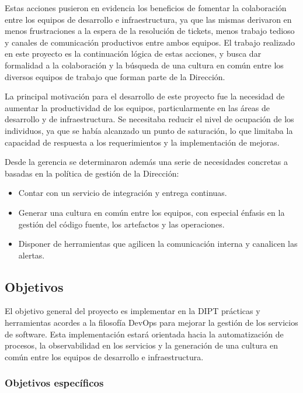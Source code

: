 Estas acciones pusieron en evidencia los beneficios de fomentar la colaboración entre los equipos de desarrollo e infraestructura, ya que las mismas derivaron en menos frustraciones a la espera de la resolución de tickets, menos trabajo tedioso y canales de comunicación productivos entre ambos equipos. El trabajo realizado en este proyecto es la continuación lógica de estas acciones, y busca dar formalidad a la colaboración y la búsqueda de una cultura en común entre los diversos equipos de trabajo que forman parte de la Dirección.

La principal motivación para el desarrollo de este proyecto fue la necesidad de aumentar la productividad de los equipos, particularmente en las áreas de desarrollo y de infraestructura. Se necesitaba reducir el nivel de ocupación de los individuos, ya que se había alcanzado un punto de saturación, lo que limitaba la capacidad de respuesta a los requerimientos y la implementación de mejoras.

Desde la gerencia se determinaron además una serie de necesidades concretas a basadas en la política de gestión de la Dirección:

\begin{itemize}
\item Contar con un servicio de integración y entrega continuas.
\item Generar una cultura en común entre los equipos, con especial énfasis en la gestión del código fuente, los artefactos y las operaciones.
\item Disponer de herramientas que agilicen la comunicación interna y canalicen las alertas.
\end{itemize}
\subsection{Objetivos}

El objetivo general del proyecto es implementar en la DIPT prácticas y herramientas acordes a la filosofía DevOps para mejorar la gestión de los servicios de software. Esta implementación estará orientada hacia la automatización de procesos, la observabilidad en los servicios y la generación de una cultura en común entre los equipos de desarrollo e infraestructura.

\subsubsection{Objetivos específicos}

